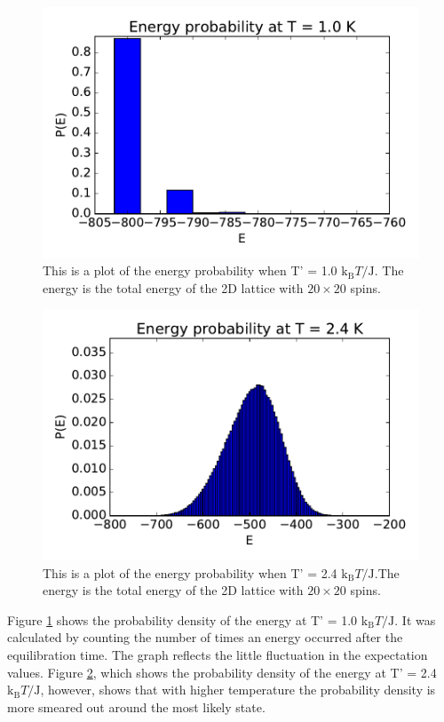\begin{figure}[H]
\includegraphics[width=\linewidth]{../results/4d/d_T_1probability}\caption{This is a plot of the energy probability when T' = 1.0 $\text{k}_\text{B}T/\text{J}$. The energy is the total energy of the 2D lattice with $20\times 20$ spins.}\label{fig:probability_T_1.0}
\end{figure}

\begin{figure}[H]
\includegraphics[width=\linewidth]{../results/4d/d_T_2_4probability}\caption{This is a plot of the energy probability when T' = 2.4 $\text{k}_\text{B}T/\text{J}$.The energy is the total energy of the 2D lattice with $20\times 20$ spins.}\label{fig:probability_T_2.4}
\end{figure}

Figure \ref{fig:probability_T_1.0} shows the probability density of the energy at T' = 1.0 $\text{k}_\text{B}T/\text{J}$. It was calculated by counting the number of times an energy occurred after the equilibration time. The graph reflects the little fluctuation in the expectation values. Figure \ref{fig:probability_T_2.4}, which shows the probability density of the energy at T' = 2.4 $\text{k}_\text{B}T/\text{J}$, however, shows that with higher temperature the probability density is more smeared out around the most likely state. 

